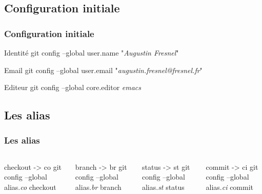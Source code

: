 \documentclass[t,11pt]{beamer}
\begin{document}
\subsection{Configuration initiale}
\begin{frame}
        \frametitle{Configuration initiale}
        \begin{block}{Identit\'e}
                git config --global user.name "\emph{Augustin Fresnel}"
        \end{block}
        
        \begin{block}{Email}
                git config --global user.email "\emph{augustin.fresnel@fresnel.fr}"
        \end{block}

        \begin{block}{Editeur}
                git config --global core.editor \emph{emacs}
        \end{block}
\end{frame}

\subsection{Les alias}
\begin{frame}
        \frametitle{Les alias}
        \vspace{-7mm}
        \begin{columns}

                \begin{block}{checkout -> co}
                        git config --global alias.\emph{co} checkout
                \end{block}

                \begin{block}{branch -> br}
                        git config --global alias.\emph{br} branch
                \end{block}

                \begin{block}{status -> st}
                        git config --global alias.\emph{st} status
                \end{block}

                \begin{block}{commit -> ci}
                        git config --global alias.\emph{ci} commit
                \end{block}

        \end{columns}
\end{frame}
\end{document}
